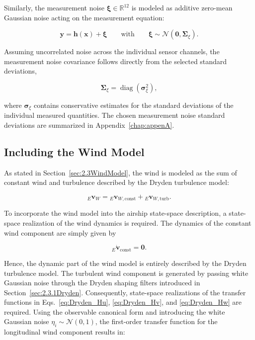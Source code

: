 Similarly, the measurement noise $\bm{\xi} \in \mathbb{R}^{12}$ is modeled as additive zero-mean Gaussian noise acting on the measurement equation:

\begin{equation}
	\bm{y}
	=
	\bm{h}(\bm{x})
	+
	\bm{\xi} 
	\qquad
	\text{with}
	\qquad
	\bm{\xi}
	\sim
	\mathcal{N}
	\left(
	\bm{0},
	\bm{\Sigma}_{\xi}
	\right).
\end{equation}

Assuming uncorrelated noise across the individual sensor channels, the measurement noise covariance follows directly from the selected standard deviations,

\begin{equation}
	\bm{\Sigma}_{\xi}
	=
	\operatorname{diag}
	\left(
	\bm{\sigma}_{\xi}^{2}
	\right),
\end{equation}

where $\bm{\sigma}_{\xi}$ contains conservative estimates for the standard deviations of the individual measured quantities. The chosen measurement noise standard deviations are summarized in Appendix~\ref{chap:appenA}.





\subsection{Including the Wind Model}
\label{sec:3.1.2WindModel}

As stated in Section~\ref{sec:2.3WindModel}, the wind is modeled as the sum of constant wind and turbulence described by the Dryden turbulence model:

\begin{equation}
	{}_E \bm{v}_W = {}_E \bm{v}_{W, \mathrm{const}} + {}_E \bm{v}_{W, \mathrm{turb}}.
\end{equation}

To incorporate the wind model into the airship state-space description, a state-space realization of the wind dynamics is required. The dynamics of the constant wind component are simply given by

\begin{equation}
	{}_E\dot{\bm{v}}_\mathrm{const}=\bm{0}.
\end{equation}

Hence, the dynamic part of the wind model is entirely described by the Dryden turbulence model.
The turbulent wind component is generated by passing white Gaussian noise through the Dryden shaping filters introduced in Section~\ref{sec:2.3.1Dryden}. Consequently, state-space realizations of the transfer functions in Eqs.~\eqref{eq:Dryden_Hu}, \eqref{eq:Dryden_Hv}, and \eqref{eq:Dryden_Hw} are required. Using the observable canonical form \cite{Lunze2012Regelungstechnik1} and introducing the white Gaussian noise $\eta_i \sim \mathcal{N}(0, 1)$, the first-order transfer function for the longitudinal wind component results in:

